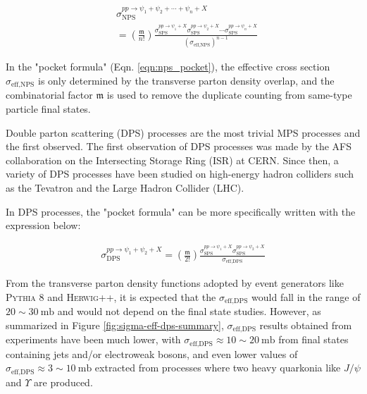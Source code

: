 \documentclass[10pt,twocolumn]{article}
\newcommand*{\effXsecDPS}{\sigma_{\text{eff,DPS}}}
\begin{document}
\begin{equation}
\begin{aligned}
    \label{eqn:nps_pocket}
    &\sigma^{pp\to\psi_1+\psi_2+\cdots+\psi_n+X}_{\text{NPS}} \\&=
    \left(\frac {\mathfrak{m}}{n!}\right) \frac{\sigma_{\text{SPS}}^{pp\to \psi_1+X}\sigma_{\text{SPS}}^{pp\to \psi_2+X}\cdots\sigma_{\text{SPS}}^{pp\to \psi_n+X}}{(\sigma_{\text{eff,NPS}})^{n-1}}
\end{aligned}
\end{equation}

In the "pocket formula" (Eqn. \ref{eqn:nps_pocket}), the effective cross section $\sigma_{\text{eff,NPS}}$ is only determined by the transverse parton density overlap, and the combinatorial factor $\mathfrak{m}$ is used to remove the duplicate counting from same-type particle final states.

Double parton scattering (DPS) processes are the most trivial MPS processes and the first observed. The first observation of DPS processes was made by the AFS collaboration on the Intersecting Storage Ring (ISR) at CERN\cite{AxialFieldSpectrometer:1986dfj}. Since then, a variety of DPS processes have been studied on high-energy hadron colliders such as the Tevatron and the Large Hadron Collider (LHC).

In DPS processes, the "pocket formula" can be more specifically written with the expression below:

\begin{equation}
\begin{aligned}
    \label{eqn:dps_pocket}
    \sigma^{pp\to\psi_1+\psi_2+X}_{\text{DPS}}=
    \left(\frac {\mathfrak{m}}{2!}\right) \frac{\sigma_{\text{SPS}}^{pp\to \psi_1+X}\sigma_{\text{SPS}}^{pp\to \psi_2+X}}{\effXsecDPS}
\end{aligned}
\end{equation}

From the transverse parton density functions adopted by event generators like \textsc{Pythia 8} and \textsc{Herwig++}, it is expected that the $\sigma_\text{eff,DPS}$ would fall in the range of $20 \sim 30~\mathrm{mb}$ and would not depend on the final state studies. However, as summarized in Figure \ref{fig:sigma-eff-dps-summary}, $\sigma_\text{eff,DPS}$ results obtained from experiments have been much lower, with $\sigma_\text{eff,DPS}\approx 10\sim 20~\text{mb}$ from final states containing jets and/or electroweak bosons\cite{ATLAS_4JET_7TEV}\cite{ATLAS_WJetJet_7TEV}\cite{ATLAS_Z_JPSI}\cite{CDF_4JET}\cite{CMS_4JET_13TEV}\cite{CMS_WJETJET_7TEV}\cite{CMS_WW_DPS_8TEV_LIM}\cite{CMS_WW_DPS_13TEV_FOUND}, and even lower values of $\sigma_\text{eff,DPS}\approx 3\sim 10~\text{mb}$ extracted from processes where two heavy quarkonia like $J/\psi$ and $\Upsilon$ are produced\cite{ATLAS_JPSIJPSI_8TEV}\cite{ATLAS_JPSI_PSI2S_7_8_TEV_COMBINED}\cite{CMS_INCL_JPSIJPSI_7TEV}\cite{ CMS_JPSIPSI2S_7TEV}\cite{CMS_JPSIPSI2S_DIFF_7TEV}\cite{CMS_YY_8TEV}\cite{CMS_YY_XSEC}.
\end{document}

